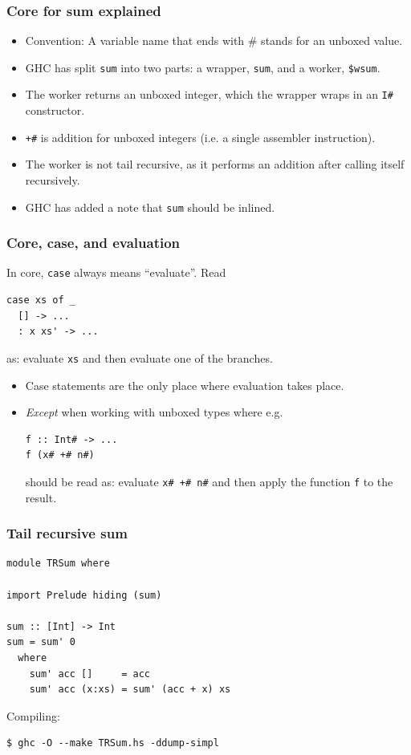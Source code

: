 \documentclass{beamer}
\begin{document}
\begin{frame}[fragile]
  \frametitle{Core for sum explained}

  \begin{itemize}
  \item Convention: A variable name that ends with \# stands for an
    unboxed value.
  \item GHC has split \lstinline!sum! into two parts: a wrapper,
    \texttt{sum}, and a worker, \texttt{\$wsum}.
  \item The worker returns an unboxed integer, which the wrapper wraps
    in an \lstinline!I#! constructor.
  \item \texttt{+\#} is addition for unboxed integers (i.e. a single
    assembler instruction).
  \item The worker is not tail recursive, as it performs an addition
    after calling itself recursively.
  \item GHC has added a note that \texttt{sum} should be inlined.
  \end{itemize}
\end{frame}

\begin{frame}[fragile]
  \frametitle{Core, case, and evaluation}

  In core, \texttt{case} always means ``evaluate''.  Read
\begin{verbatim}
case xs of _
  [] -> ...
  : x xs' -> ...
\end{verbatim}
  as: evaluate \texttt{xs} and then evaluate one of the branches.

  \begin{itemize}
  \item Case statements are the only place where evaluation takes
    place.
  \item \emph{Except} when working with unboxed types where e.g.
\begin{verbatim}
f :: Int# -> ...
f (x# +# n#)
\end{verbatim}
    should be read as: evaluate \texttt{x\# +\# n\#} and then apply
    the function \texttt{f} to the result.
  \end{itemize}
\end{frame}

\begin{frame}[fragile]
  \frametitle{Tail recursive sum}

  \begin{lstlisting}
module TRSum where

import Prelude hiding (sum)

sum :: [Int] -> Int
sum = sum' 0
  where
    sum' acc []     = acc
    sum' acc (x:xs) = sum' (acc + x) xs
  \end{lstlisting}

  Compiling:
  \begin{verbatim}
$ ghc -O --make TRSum.hs -ddump-simpl
  \end{verbatim}
\end{frame}
\end{document}
